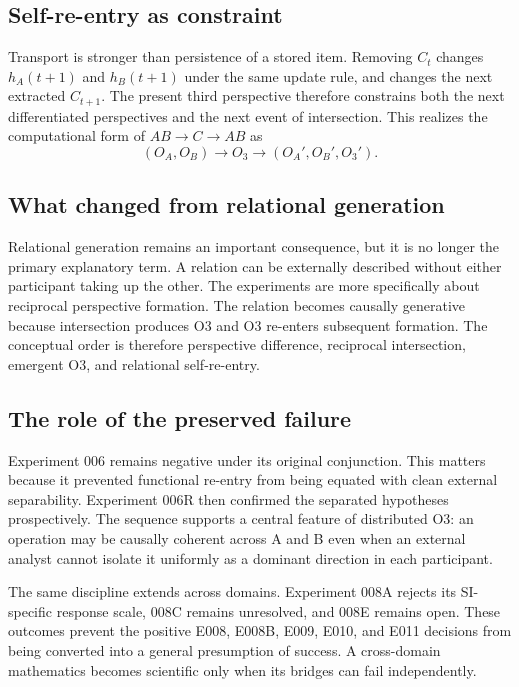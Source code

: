 \documentclass[11pt,a4paper]{article}
\newcommand{\OA}{\ensuremath{O_{A}}}
\newcommand{\OB}{\ensuremath{O_{B}}}
\newcommand{\Othree}{\ensuremath{O_{3}}}
\begin{document}
\subsection{Self-re-entry as constraint}

Transport is stronger than persistence of a stored item. Removing $C_t$ changes $h_A(t+1)$ and $h_B(t+1)$ under the same update rule, and changes the next extracted $C_{t+1}$. The present third perspective therefore constrains both the next differentiated perspectives and the next event of intersection. This realizes the computational form of $AB\rightarrow C\rightarrow AB$ as
\[
 (\OA,\OB)\rightarrow\Othree
 \rightarrow(\OA',\OB',\Othree').
\]

\subsection{What changed from relational generation}

Relational generation remains an important consequence, but it is no longer the primary explanatory term. A relation can be externally described without either participant taking up the other. The experiments are more specifically about reciprocal perspective formation. The relation becomes causally generative because intersection produces O3 and O3 re-enters subsequent formation. The conceptual order is therefore perspective difference, reciprocal intersection, emergent O3, and relational self-re-entry.

\subsection{The role of the preserved failure}

Experiment 006 remains negative under its original conjunction. This matters because it prevented functional re-entry from being equated with clean external separability. Experiment 006R then confirmed the separated hypotheses prospectively. The sequence supports a central feature of distributed O3: an operation may be causally coherent across A and B even when an external analyst cannot isolate it uniformly as a dominant direction in each participant.

The same discipline extends across domains. Experiment 008A rejects its SI-specific response scale, 008C remains unresolved, and 008E remains open. These outcomes prevent the positive E008, E008B, E009, E010, and E011 decisions from being converted into a general presumption of success. A cross-domain mathematics becomes scientific only when its bridges can fail independently.
\end{document}
